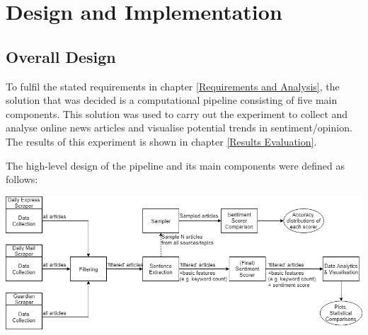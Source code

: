 \documentclass{report}
\begin{document}


\chapter{Design and Implementation} \label{Design and Implementation} %

\section{Overall Design} \label{Overall Design}

To fulfil the stated requirements in chapter \ref{Requirements and Analysis}, the solution that was decided is a computational pipeline consisting of five main components.
This solution was used to carry out the experiment to collect and analyse online news articles and visualise potential trends in sentiment/opinion.
The results of this experiment is shown in chapter \ref{Results Evaluation}.

The high-level design of the pipeline and its main components were defined as follows:

\vspace{0.5em}
\noindent
\includegraphics[width=\textwidth]{overall-design2.png}
\end{document}
